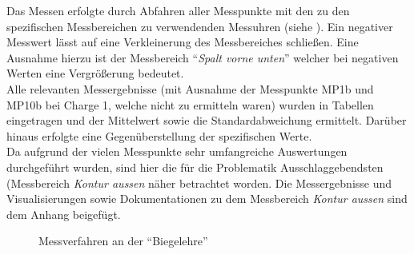 \documentclass[12pt,a4paper,parskip]{scrartcl}
\begin{document}
 
Das Messen erfolgte durch Abfahren aller Messpunkte mit den zu den spezifischen Messbereichen zu verwendenden Messuhren (siehe ). Ein negativer Messwert lässt auf eine Verkleinerung des Messbereiches schließen. Eine Ausnahme hierzu ist der Messbereich "`\emph{Spalt vorne unten}"' welcher  bei negativen Werten eine Vergrößerung bedeutet.\\
 Alle relevanten Messergebnisse (mit Ausnahme der Messpunkte MP1b und MP10b bei Charge 1, welche nicht zu ermitteln waren) wurden in Tabellen eingetragen und  der Mittelwert sowie die Standardabweichung
 ermittelt. Darüber hinaus erfolgte eine Gegenüberstellung der spezifischen Werte.\\
Da aufgrund der vielen Messpunkte  sehr umfangreiche Auswertungen durchgeführt wurden,  sind hier die für die Problematik Ausschlaggebendsten  (Messbereich \emph{Kontur aussen} näher betrachtet worden. Die Messergebnisse und Visualisierungen sowie Dokumentationen zu dem Messbereich \emph{Kontur aussen} sind dem Anhang beigefügt. 
\begin{figure}[hbtp]
\centering
\hfill
{}
\hfill
{}
\hfill
\caption{Messverfahren an der "`Biegelehre"' }
\label{fig:messverfahren}
\end{figure}
\end{document}
